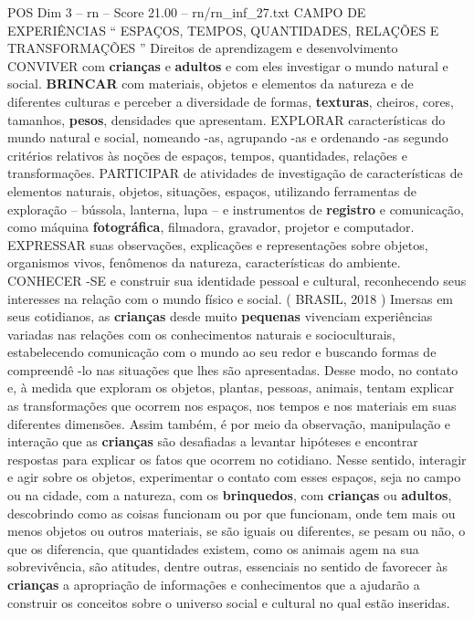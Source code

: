 \begin{textsample}{POS Dim 3 – rn – Score 21.00 – rn/rn\_inf\_27.txt}  \label{ex:f3_pos_095}
CAMPO DE EXPERIÊNCIAS “ ESPAÇOS, TEMPOS, QUANTIDADES, RELAÇÕES E TRANSFORMAÇÕES ” Direitos de aprendizagem e desenvolvimento CONVIVER com \textbf{crianças} e \textbf{adultos} e com eles investigar o mundo natural e social. \textbf{BRINCAR} com materiais, objetos e elementos da natureza e de diferentes culturas e perceber a diversidade de formas, \textbf{texturas}, cheiros, cores, tamanhos, \textbf{pesos}, densidades que apresentam.
EXPLORAR características do mundo natural e social, nomeando -as, agrupando -as e ordenando -as segundo critérios relativos às noções de espaços, tempos, quantidades, relações e transformações.
PARTICIPAR de atividades de investigação de características de elementos naturais, objetos, situações, espaços, utilizando ferramentas de exploração – bússola, lanterna, lupa – e instrumentos de \textbf{registro} e comunicação, como máquina \textbf{fotográfica}, filmadora, gravador, projetor e computador.
EXPRESSAR suas observações, explicações e representações sobre objetos, organismos vivos, fenômenos da natureza, características do ambiente.
CONHECER -SE e construir sua identidade pessoal e cultural, reconhecendo seus interesses na relação com o mundo físico e social. ( BRASIL, 2018 ) Imersas em seus cotidianos, as \textbf{crianças} desde muito \textbf{pequenas} vivenciam experiências variadas nas relações com os conhecimentos naturais e socioculturais, estabelecendo comunicação com o mundo ao seu redor e buscando formas de compreendê -lo nas situações que lhes são apresentadas.
Desse modo, no contato e, à medida que exploram os objetos, plantas, pessoas, animais, tentam explicar as transformações que ocorrem nos espaços, nos tempos e nos materiais em suas diferentes dimensões.
Assim também, é por meio da observação, manipulação e interação que as \textbf{crianças} são desafiadas a levantar hipóteses e encontrar respostas para explicar os fatos que ocorrem no cotidiano.
Nesse sentido, interagir e agir sobre os objetos, experimentar o contato com esses espaços, seja no campo ou na cidade, com a natureza, com os \textbf{brinquedos}, com \textbf{crianças} ou \textbf{adultos}, descobrindo como as coisas funcionam ou por que funcionam, onde tem mais ou menos objetos ou outros materiais, se são iguais ou diferentes, se pesam ou não, o que os diferencia, que quantidades existem, como os animais agem na sua sobrevivência, são atitudes, dentre outras, essenciais no sentido de favorecer às \textbf{crianças} a apropriação de informações e conhecimentos que a ajudarão a construir os conceitos sobre o universo social e cultural no qual estão inseridas.

\end{textsample}
